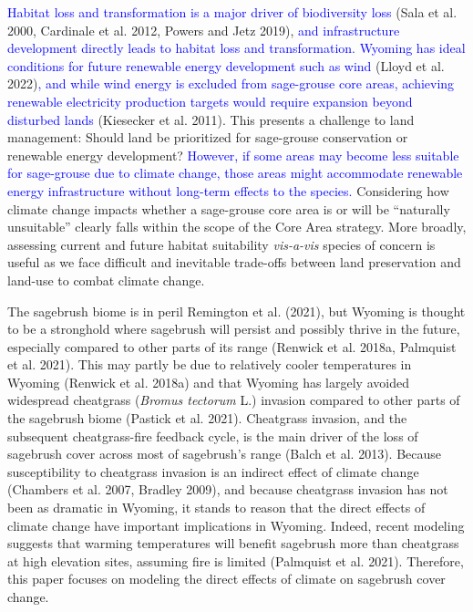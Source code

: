 \documentclass[
  12pt,
]{article}
\begin{document}
\textcolor{blue}{Habitat loss and transformation is a major driver of biodiversity loss} (Sala et al. 2000, Cardinale et al. 2012, Powers and Jetz 2019), \textcolor{blue}{and infrastructure development directly leads to habitat loss and transformation.}
\textcolor{blue}{Wyoming has ideal conditions for future renewable energy development such as wind} (Lloyd et al. 2022)\textcolor{blue}{, and while wind energy is excluded from sage-grouse core areas, achieving renewable electricity production targets would require expansion beyond disturbed lands} (Kiesecker et al. 2011).
This presents a challenge to land management: Should land be prioritized for sage-grouse conservation or renewable energy development?
\textcolor{blue}{However, if some areas may become less suitable for sage-grouse due to climate change, those areas might accommodate renewable energy infrastructure without long-term effects to the species.}
Considering how climate change impacts whether a sage-grouse core area is or will be ``naturally unsuitable'' clearly falls within the scope of the Core Area strategy.
More broadly, assessing current and future habitat suitability \emph{vis-a-vis} species of concern is useful as we face difficult and inevitable trade-offs between land preservation and land-use to combat climate change.

The sagebrush biome is in peril Remington et al. (2021),
but Wyoming is thought to be a stronghold where sagebrush will persist and possibly thrive in the future, especially compared to other parts of its range (Renwick et al. 2018a, Palmquist et al. 2021).
This may partly be due to relatively cooler temperatures in Wyoming (Renwick et al. 2018a) and that Wyoming has largely avoided widespread cheatgrass (\emph{Bromus tectorum} L.) invasion compared to other parts of the sagebrush biome (Pastick et al. 2021).
Cheatgrass invasion, and the subsequent cheatgrass-fire feedback cycle, is the main driver of the loss of sagebrush cover across most of sagebrush's range (Balch et al. 2013).
Because susceptibility to cheatgrass invasion is an indirect effect of climate change (Chambers et al. 2007, Bradley 2009), and because cheatgrass invasion has not been as dramatic in Wyoming, it stands to reason that the direct effects of climate change have important implications in Wyoming.
Indeed, recent modeling suggests that warming temperatures will benefit sagebrush more than cheatgrass at high elevation sites, assuming fire is limited (Palmquist et al. 2021).
Therefore, this paper focuses on modeling the direct effects of climate on sagebrush cover change.
\end{document}

